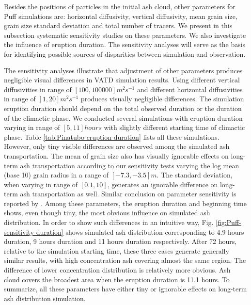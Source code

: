 \documentclass[draft,linenumbers]{agujournal2019}
\begin{document}
Besides the positions of particles in the initial ash cloud, other parameters for Puff simulations are: horizontal diffusivity, vertical diffusivity, mean grain size, grain size standard deviation and total number of tracers. We present in this subsection systematic sensitivity studies on these parameters. We also investigate the influence of eruption duration. The sensitivity analyses will serve as the basis for identifying possible sources of disparities between simulation and observation.

The sensitivity analyses illustrate that adjustment of other parameters produces negligible visual differences in VATD simulation results. Using different vertical diffusivities in range of $[100, 100000] m^2s^{-1} $ and different horizontal diffusivities in range of $[1, 20] m^2s^{-1}$ produces visually negligible differences. The simulation eruption duration should depend on the total observed duration or the duration of the climactic phase. We conducted several simulations with eruption duration varying in range of $[5, 11] hours$ with slightly different starting time of climactic phase. Table \ref{tab:Pinatubo-eruption-duration} lists all these simulations. However, only tiny visible differences are observed among the simulated ash transportation. The mean of grain size also has visually ignorable effects on long-term ash transportation according to our sensitivity tests varying the log mean (base 10) grain radius in a range of $[-7.3, -3.5] m$. The standard deviation, when varying in range of $[0.1, 10]$, generates an ignorable difference on long-term ash transportation as well. Similar conclusion on parameter sensitivity is reported by \citet[e.g.][]{fero2008simulation, daniele2009applications}. Among these parameters, the eruption duration and beginning time shows, even though tiny, the most obvious influence on simulated ash distribution. In order to show such differences in an intuitive way, Fig. \ref{fig:Puff-sensitivity-duration} shows simulated ash distribution corresponding to 4.9 hours duration, 9 hours duration and 11 hours duration respectively. After 72 hours, relative to the simulation starting time, these three cases generate generally similar results, with high concentration ash covering almost the same region. The difference of lower concentration distribution is relatively more obvious. Ash cloud covers the broadest area when the eruption duration is 11.1 hours. To summarize, all these parameters have either tiny or ignorable effects on long-term ash distribution simulation.
\end{document}
